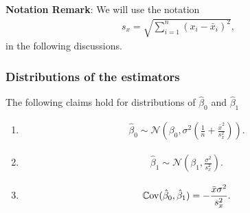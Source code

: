 \documentclass{book}
\begin{document}
\noindent \textbf{Notation Remark}: We will use the notation
\begin{align}
    s_x = \sqrt{\sum_{i=1}^{n}(x_i - \bar{x}_i)^2},
\end{align}
in the following discussions.

\subsubsection{Distributions of the estimators}

\theorem 
\label{thm:SLR:beta_0_1_dist_cov}
The following claims hold for distributions of $\hat{\beta}_0$ and $\hat{\beta}_1$ 
\begin{enumerate}
\item 
\begin{align}
    \hat\beta_0 \sim \mathcal{N}\left(\beta_0,\sigma^2\left(\frac{1}{n} + \frac{\bar{x}^2}{s_x^2}\right)\right).
    \label{eqn:SLR:beta_0_dist}
\end{align}
\item 
\begin{align}
    \hat\beta_1 \sim \mathcal{N}\left(\beta_1,\frac{\sigma^2}{s_x^2}\right).
    \label{eqn:SLR:beta_1_dist}
\end{align}
\item 
\begin{align}
    \operatorname{\mathbb Cov}(\hat{\beta}_0,\hat{\beta}_1) = -\frac{\bar{x}\sigma^2}{s_x^2}.
    \label{eqn:SLR:cov_beta_0_beta_1}
\end{align}
\end{enumerate}
\end{document}
